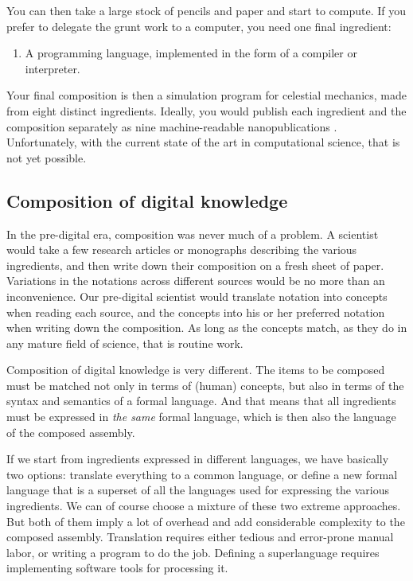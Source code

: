 You can then take a large stock of pencils and paper and start to compute. If you prefer to delegate the grunt work to a computer, you need one final ingredient:

\begin{enumerate}
\setcounter{enumi}{\themyCounter}
\item A programming language, implemented in the form of a compiler or interpreter.
\end{enumerate}

Your final composition is then a simulation program for celestial mechanics, made from eight distinct ingredients. Ideally, you would publish each ingredient and the composition separately as nine machine-readable nanopublications \cite{groth_anatomy_2010}. Unfortunately, with the current state of the art in computational science, that is not yet possible.

\subsection{Composition of digital knowledge}
\label{composition-digital}

In the pre-digital era, composition was never much of a problem. A scientist would take a few research articles or monographs describing the various ingredients, and then write down their composition on a fresh sheet of paper. Variations in the notations across different sources would be no more than an inconvenience. Our pre-digital scientist would translate notation into concepts when reading each source, and the concepts into his or her preferred notation when writing down the composition. As long as the concepts match, as they do in any mature field of science, that is routine work.

Composition of digital knowledge is very different. The items to be composed must be matched not only in terms of (human) concepts, but also in terms of the syntax and semantics of a formal language. And that means that all ingredients must be expressed in \textit{the same} formal language, which is then also the language of the composed assembly.

If we start from ingredients expressed in different languages, we have basically two options: translate everything to a common language, or define a new formal language that is a superset of all the languages used for expressing the various ingredients. We can of course choose a mixture of these two extreme approaches. But both of them imply a lot of overhead and add considerable complexity to the composed assembly. Translation requires either tedious and error-prone manual labor, or writing a program to do the job. Defining a superlanguage requires implementing software tools for processing it.

